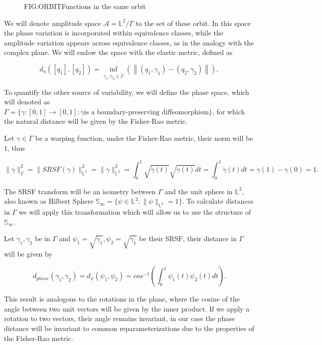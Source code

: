 \begin{figure}[Functions in the same orbit]{FIG:ORBIT}{Functions in the same orbit}
   \quad
\end{figure}

We will denote amplitude space $\mathscr{A}= \mathbb{L}^{2} / \Gamma$  to the
set of these orbit. In this space the phase variation is incorporated within
equivalence classes, while the amplitude variation appears across equivalence
classes, as in the analogy with the complex plane. We will endow the space with
the elastic metric, defined as

$$
d_{a}\left(\left[q_{1}\right],\left[q_{2}\right]\right)=\inf _{
\gamma_{1}, \gamma_{2} \in \tilde{\Gamma}}\left(\left\|\left(q_{1},
 \gamma_{1}\right)-\left(q_{2}, \gamma_{2}\right)\right\|\right),
$$

To quantify the other source of variability, we will define the phase space,
which will denoted as
$\Gamma = \{\gamma :[0,1] \rightarrow[0,1]  : \gamma \text{is a boundary-preserving diffeomorphism}\}$,
for which the natural distance will be given by the Fisher-Rao metric.

Let $\gamma \in \Gamma$ be a warping function, under the Fisher-Rao metric,
their norm will be 1, thus

$$
\| \gamma \|_\Gamma^2 = \| SRSF(\gamma)\|_{\mathbb{L}^2}^2 =  \| \dot \gamma\|_{\mathbb{L}^2}^2 =
\int_0^1 \sqrt{\dot \gamma (t)} \sqrt{\dot \gamma (t)}dt =
\int_0^1 \dot \gamma(t)dt = \gamma(1) - \gamma(0) = 1.
$$

The SRSF transform will be an isometry between $\Gamma$ and the unit sphere in
$\mathbb{L}^2$, also known as Hilbert Sphere
$\mathbb{S}_\infty = \{ \psi \in \mathbb{L}^2 : \|\psi\|_{\mathbb{L}^2}=1\}$.
To calculate distances in $\Gamma$ we will apply this transformation which will
allow us to use the structure of $\mathbb{S}_\infty$.

Let $\gamma_1, \gamma_2$ be in $\Gamma$ and $\psi_1=\sqrt{\dot \gamma_1},
\psi_2=\sqrt{\dot \gamma_1}$ be their SRSF, their distance in $\Gamma$ will be
given by

$$
d_{phase}(\gamma_1, \gamma_2) = d_{\psi}(\psi_1, \psi_2) =
cos^{-1}(\int_0^1 \psi_1(t) \psi_2(t) dt).
$$

This result is analogous to the rotations in the plane, where the cosine of
the angle between two unit vectors will be given by the inner product.
If we apply a rotation to two vectors, their angle remains invariant, in our
case the phase distance will be invariant to common reparameterizations due to
the properties of the Fisher-Rao metric.

